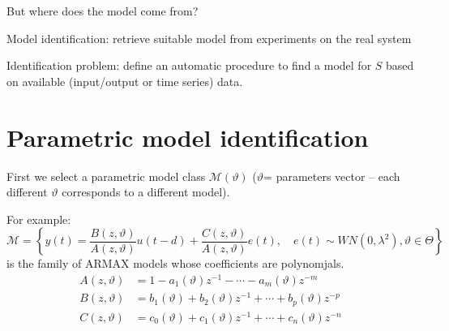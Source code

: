 But where does the model come from?

Model identification: retrieve suitable model from experiments on the real system 


Identification problem: define an automatic procedure to find a model for $S$ based on available (input/output or time series) data.

\begin{figure}[htpb]
	\centering
\end{figure}
\FloatBarrier

\section{Parametric model identification}

First we select a parametric model class $\mathcal{M}(\vartheta)$ ($\vartheta$= parameters vector – each different $\vartheta$ corresponds to a different model).

For example:
$$
	\mathcal{M}=\left\{y(t)=\frac{B(z, \vartheta)}{A(z, \vartheta)} u(t-d)+\frac{C(z, \vartheta)}{A(z, \vartheta)} e(t), \quad e(t) \sim WN\left(0, \lambda^{2}\right), \vartheta\in\Theta\right\}
$$
is the family of ARMAX models whose coefficients are polynomjals.
\begin{align*}
	A(z, \vartheta)&=1-a_{1}(\vartheta) z^{-1}-\cdots-a_{m}(\vartheta) z^{-m} \\
	B(z, \vartheta)&=b_{1}(\vartheta)+b_{2}(\vartheta) z^{-1}+\cdots+b_{p}(\vartheta) z^{-p}\\
	C(z, \vartheta)&=c_0(\vartheta)+c_{1}(\vartheta) z^{-1}+\cdots+c_{n}(\vartheta) z^{-n}
\end{align*}

